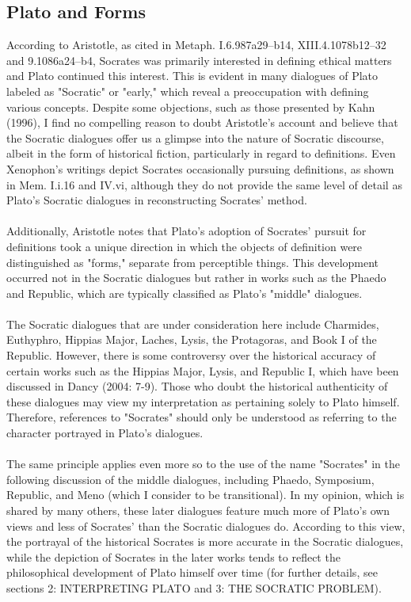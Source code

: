 \subsection{Plato and Forms}
 According to Aristotle, as cited in Metaph. I.6.987a29–b14, XIII.4.1078b12–32 and 9.1086a24–b4, Socrates was primarily interested in defining ethical matters and Plato continued this interest. This is evident in many dialogues of Plato labeled as "Socratic" or "early," which reveal a preoccupation with defining various concepts. Despite some objections, such as those presented by Kahn (1996), I find no compelling reason to doubt Aristotle's account and believe that the Socratic dialogues offer us a glimpse into the nature of Socratic discourse, albeit in the form of historical fiction, particularly in regard to definitions. Even Xenophon's writings depict Socrates occasionally pursuing definitions, as shown in Mem. I.i.16 and IV.vi, although they do not provide the same level of detail as Plato's Socratic dialogues in reconstructing Socrates' method.
\\
\\
Additionally, Aristotle notes that Plato's adoption of Socrates' pursuit for definitions took a unique direction in which the objects of definition were distinguished as "forms," separate from perceptible things. This development occurred not in the Socratic dialogues but rather in works such as the Phaedo and Republic, which are typically classified as Plato's "middle" dialogues.
\\
\\
The Socratic dialogues that are under consideration here include Charmides, Euthyphro, Hippias Major, Laches, Lysis, the Protagoras, and Book I of the Republic. However, there is some controversy over the historical accuracy of certain works such as the Hippias Major, Lysis, and Republic I, which have been discussed in Dancy (2004: 7-9). Those who doubt the historical authenticity of these dialogues may view my interpretation as pertaining solely to Plato himself. Therefore, references to "Socrates" should only be understood as referring to the character portrayed in Plato's dialogues.
\\
\\
The same principle applies even more so to the use of the name "Socrates" in the following discussion of the middle dialogues, including Phaedo, Symposium, Republic, and Meno (which I consider to be transitional). In my opinion, which is shared by many others, these later dialogues feature much more of Plato's own views and less of Socrates' than the Socratic dialogues do. According to this view, the portrayal of the historical Socrates is more accurate in the Socratic dialogues, while the depiction of Socrates in the later works tends to reflect the philosophical development of Plato himself over time (for further details, see sections 2: INTERPRETING PLATO and 3: THE SOCRATIC PROBLEM).
